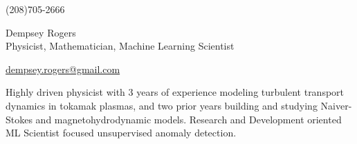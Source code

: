 \documentclass[letterpaper,11pt]{article}
\begin{document}
\begin{center}
    \begin{minipage}[b]{0.24\textwidth}
            \large (208)705-2666 
    \end{minipage}%
    \begin{minipage}[b]{0.45\textwidth}
            \centering
            {\Huge Dempsey Rogers} \\ %
            \vspace{0.1cm}
            {\color{cvblue} \Large{Physicist, Mathematician, Machine Learning Scientist}} \\
    \end{minipage}%
    \begin{minipage}[t]{0.24\textwidth}
            {\href{mailto:dempsey.rogers@gmail.com}{dempsey.rogers@gmail.com} } 
    \end{minipage}   
    
\vspace{-0.15cm} 
{\color{cvblue} \hrulefill}
\end{center}
\vspace{-0.2cm}
Highly driven physicist with 3 years of experience modeling turbulent transport dynamics in tokamak plasmas, and two prior years building and studying Naiver-Stokes and magnetohydrodynamic models. Research and Development oriented ML Scientist focused unsupervised anomaly detection. %

\vspace{-0.2cm}


\section{\color{cvblue}{Education} }
\end{document}
